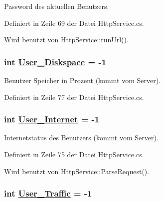 Password des aktuellen Benutzers. 



Definiert in Zeile 69 der Datei Http\-Service.cs.

Wird benutzt von Http\-Service::run\-Url().\hypertarget{classQbeSAS_1_1HttpService_1_1ServiceDataType_QbeSAS_1_1HttpService_1_1ServiceDataTypeo4}{
\subsubsection[User\_\-Diskspace]{\setlength{\rightskip}{0pt plus 5cm}int \hyperlink{classQbeSAS_1_1HttpService_1_1ServiceDataType_QbeSAS_1_1HttpService_1_1ServiceDataTypeo4}{User\_\-Diskspace} = -1}}
\label{classQbeSAS_1_1HttpService_1_1ServiceDataType_QbeSAS_1_1HttpService_1_1ServiceDataTypeo4}


Benutzer Speicher in Prozent (kommt vom Server). 



Definiert in Zeile 77 der Datei Http\-Service.cs.\hypertarget{classQbeSAS_1_1HttpService_1_1ServiceDataType_QbeSAS_1_1HttpService_1_1ServiceDataTypeo3}{
\subsubsection[User\_\-Internet]{\setlength{\rightskip}{0pt plus 5cm}int \hyperlink{classQbeSAS_1_1HttpService_1_1ServiceDataType_QbeSAS_1_1HttpService_1_1ServiceDataTypeo3}{User\_\-Internet} = -1}}
\label{classQbeSAS_1_1HttpService_1_1ServiceDataType_QbeSAS_1_1HttpService_1_1ServiceDataTypeo3}


Internetstatus des Benutzers (kommt vom Server). 



Definiert in Zeile 75 der Datei Http\-Service.cs.

Wird benutzt von Http\-Service::Parse\-Request().\hypertarget{classQbeSAS_1_1HttpService_1_1ServiceDataType_QbeSAS_1_1HttpService_1_1ServiceDataTypeo5}{
\subsubsection[User\_\-Traffic]{\setlength{\rightskip}{0pt plus 5cm}int \hyperlink{classQbeSAS_1_1HttpService_1_1ServiceDataType_QbeSAS_1_1HttpService_1_1ServiceDataTypeo5}{User\_\-Traffic} = -1}}
\label{classQbeSAS_1_1HttpService_1_1ServiceDataType_QbeSAS_1_1HttpService_1_1ServiceDataTypeo5}


